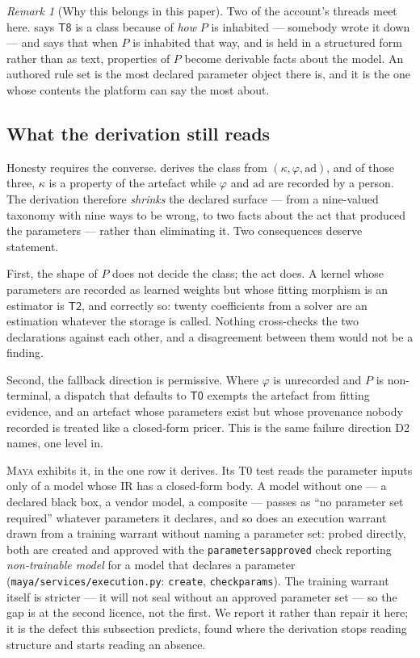 \documentclass[11pt,a4paper]{article}
\renewcommand{\_}{\oldunderscore\allowbreak}
\theoremstyle{plain}
\theoremstyle{definition}
\theoremstyle{definition}
\theoremstyle{remark}
\newtheorem{remark}[theorem]{Remark}
\begin{document}
\begin{remark}[Why this belongs in this paper]
Two of the account's threads meet here.  says $\textsf{T8}$ is a class because
of \emph{how} $P$ is inhabited --- somebody wrote it down --- and  says that when
$P$ is inhabited that way, and is held in a structured form rather than as text, properties of $P$ become
derivable facts about the model. An authored rule set is the most declared parameter object there is, and
it is the one whose contents the platform can say the most about.
\end{remark}

\subsection{What the derivation still reads}\label{sec:stilldeclared}

Honesty requires the converse.  derives the class from
$(\kappa, \varphi, \mathrm{ad})$, and of those three, $\kappa$ is a property of the artefact while
$\varphi$ and $\mathrm{ad}$ are recorded by a person. The derivation therefore \emph{shrinks} the
declared surface --- from a nine-valued taxonomy with nine ways to be wrong, to two facts about the
act that produced the parameters --- rather than eliminating it. Two consequences deserve statement.

First, the shape of $P$ does not decide the class; the act does. A kernel whose parameters are recorded
as learned weights but whose fitting morphism is an estimator is $\textsf{T2}$, and correctly so: twenty
coefficients from a solver are an estimation whatever the storage is called. Nothing cross-checks the
two declarations against each other, and a disagreement between them would not be a finding.

Second, the fallback direction is permissive. Where $\varphi$ is unrecorded and $P$ is non-terminal, a
dispatch that defaults to $\textsf{T0}$ exempts the artefact from fitting evidence, and an artefact whose
parameters exist but whose provenance nobody recorded is treated like a closed-form pricer. This is the
same failure direction D2 names, one level in.

\textsc{Maya} exhibits it, in the one row it derives. Its \textsf{T0} test reads the parameter
inputs only of a model whose IR has a closed-form body. A model without one --- a declared black box, a
vendor model, a composite --- passes as ``no parameter set required'' whatever parameters it declares, and
so does an execution warrant drawn from a training warrant without naming a parameter set: probed
directly, both are created and approved with the \texttt{parameters\_approved} check
reporting \emph{non-trainable model} for a model that declares a parameter
(\texttt{maya/services/execution.py}: \texttt{create}, \texttt{check\_params}). The training warrant itself
is stricter --- it will not seal without an approved parameter set --- so the gap is at the second licence,
not the first. We report it rather than repair it here; it is the defect this subsection predicts, found
where the derivation stops reading structure and starts reading an absence.
\end{document}
